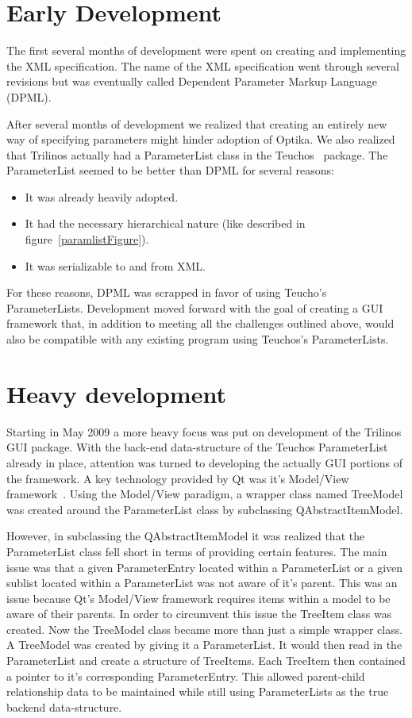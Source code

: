 \section{Early Development}
The first several months of development were spent on creating and implementing 
the XML specification. The name of the XML specification went through several 
revisions but was eventually called Dependent Parameter Markup Language (DPML).

After several months of development we realized that creating an entirely new 
way of specifying parameters might hinder adoption of Optika. We also realized 
that Trilinos actually had
a ParameterList class in the Teuchos~\cite{TeuchosPackage} package. The 
ParameterList seemed to be better than DPML for
several reasons:
	\begin{itemize}
		\item It was already heavily adopted.
		\item It had the necessary hierarchical nature (like described in 
    figure~\ref{paramlistFigure}).
		\item It was serializable to and from XML.
	\end{itemize}

For these reasons, DPML was scrapped in favor of using Teucho's ParameterLists. Development moved
forward with the goal of creating a GUI framework that, in addition to meeting all the challenges 
outlined above, would also be compatible with any existing program using Teuchos's ParameterLists.

\section{Heavy development}
Starting in May 2009 a more heavy focus was put on development of the Trilinos GUI package.
With the back-end data-structure of the Teuchos ParameterList already in place, attention
was turned to developing the actually GUI portions of the framework. A key technology provided by Qt was it's Model/View
framework~\cite{QtModelView}. Using the Model/View paradigm, a wrapper class named TreeModel
was created around the ParameterList class by subclassing QAbstractItemModel.

However, in subclassing the QAbstractItemModel it was realized that the ParameterList class fell short 
in terms of providing certain features. The main issue was that a given ParameterEntry located within
a ParameterList or a given sublist located within a ParameterList was not aware of it's parent.
This was an issue because Qt's Model/View framework requires items within a model to be aware of
their parents. In order to circumvent this issue the TreeItem class was created. Now the TreeModel class
became more than just a simple wrapper class. A TreeModel was created by giving it a ParameterList.
It would then read in the ParameterList and create a structure of TreeItems.  Each TreeItem then contained a pointer 
to it's corresponding ParameterEntry. This allowed parent-child relationship data to be maintained while
still using ParameterLists as the true backend data-structure.

